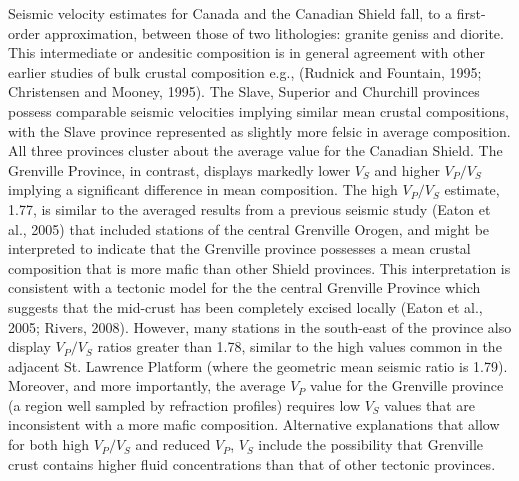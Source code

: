 \documentclass[review]{elsarticle}
\begin{document}
Seismic velocity estimates for Canada and the Canadian Shield fall, to a first-order approximation, between those of two lithologies: granite geniss and diorite. This intermediate or andesitic composition is in general agreement with other earlier studies of bulk crustal composition e.g., (Rudnick and Fountain, 1995; Christensen and Mooney, 1995). The Slave, Superior and Churchill provinces possess comparable seismic velocities implying similar mean crustal compositions, with the Slave province represented as slightly more felsic in average composition. All three provinces cluster about the average value for the Canadian Shield. The Grenville Province, in contrast, displays markedly lower $V_S$ and higher $V_P/V_S$ implying a significant difference in mean composition. The high $V_P/V_S$ estimate, 1.77, is similar to the averaged results from a previous seismic study (Eaton et al., 2005) that included stations of the central Grenville Orogen, and might be interpreted to indicate that the Grenville province possesses a mean crustal composition that is more mafic than other Shield provinces. This interpretation is consistent with a tectonic model for the the central Grenville Province which suggests that the mid-crust has been completely excised locally (Eaton et al., 2005; Rivers, 2008). However, many stations in the south-east of the province also display $V_P/V_S$ ratios greater than 1.78, similar to the high values common in the adjacent St. Lawrence Platform (where the geometric mean seismic ratio is 1.79). Moreover, and more importantly, the average $V_P$ value for the Grenville province (a region well sampled by refraction profiles) requires low $V_S$ values that are inconsistent with a more mafic composition. Alternative explanations that allow for both high $V_P/V_S$ and reduced $V_P$, $V_S$ include the possibility that Grenville crust contains higher fluid concentrations than that of other tectonic provinces.
\end{document}
